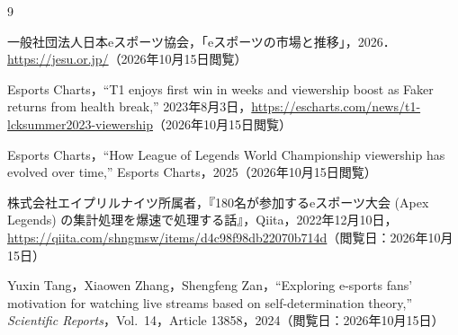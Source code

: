 \begin{thebibliography}{9}

一般社団法人日本eスポーツ協会，「eスポーツの市場と推移」，2026．\\
\url{https://jesu.or.jp/}（2026年10月15日閲覧）

Esports Charts，``T1 enjoys first win in weeks and viewership boost as Faker returns from health break,'' 2023年8月3日，\url{https://escharts.com/news/t1-lcksummer2023-viewership}（2026年10月15日閲覧）

Esports Charts，``How League of Legends World Championship viewership has evolved over time,'' Esports Charts，2025（2026年10月15日閲覧）

株式会社エイプリルナイツ所属者，『180名が参加するeスポーツ大会 (Apex Legends) の集計処理を爆速で処理する話』，Qiita，2022年12月10日，\url{https://qiita.com/shngmsw/items/d4c98f98db22070b714d}（閲覧日：2026年10月15日）

Yuxin Tang，Xiaowen Zhang，Shengfeng Zan，``Exploring e-sports fans' motivation for watching live streams based on self-determination theory,'' \textit{Scientific Reports}，Vol.~14，Article 13858，2024（閲覧日：2026年10月15日）

\end{thebibliography}